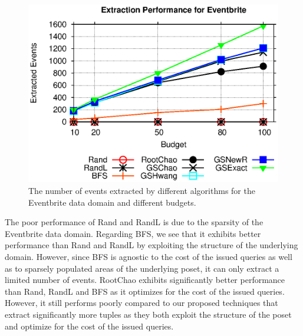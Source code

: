 \begin{figure}[h]
	\begin{center}
	\includegraphics[clip,scale=0.5]{figs/ebExtractionAll.eps}
	\caption{The number of events extracted by different algorithms for the Eventbrite data domain and different budgets.}
	\label{fig:ebextraction}
	\end{center}
	\vspace{-15pt}
\end{figure}

The poor performance of Rand and RandL is due to the sparsity of the Eventbrite data domain. Regarding BFS, we see that it exhibits better performance than Rand and RandL by exploiting the structure of the underlying domain. However, since BFS is agnostic to the cost of the issued queries as well as to sparsely populated areas of the underlying poset, it can only extract a limited number of events. RootChao exhibits significantly better performance than Rand, RandL and BFS as it optimizes for the cost of the issued queries. However, it still performs poorly compared to our proposed techniques that extract significantly more tuples as they both exploit the structure of the poset and optimize for the cost of the issued queries. 

